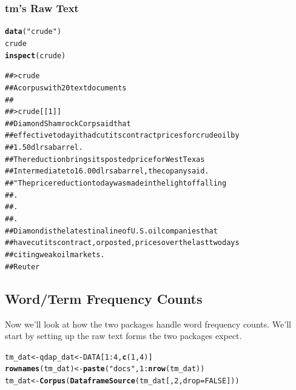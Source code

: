 \documentclass{article}\usepackage[]{graphicx}\usepackage[]{color}
\makeatletter
\newcommand{\hlnum}[1]{\textcolor[rgb]{0.686,0.059,0.569}{#1}}%
\newcommand{\hlstr}[1]{\textcolor[rgb]{0.192,0.494,0.8}{#1}}%
\newcommand{\hlopt}[1]{\textcolor[rgb]{0,0,0}{#1}}%
\newcommand{\hlstd}[1]{\textcolor[rgb]{0.345,0.345,0.345}{#1}}%
\newcommand{\hlkwb}[1]{\textcolor[rgb]{0.69,0.353,0.396}{#1}}%
\newcommand{\hlkwc}[1]{\textcolor[rgb]{0.333,0.667,0.333}{#1}}%
\newcommand{\hlkwd}[1]{\textcolor[rgb]{0.737,0.353,0.396}{\textbf{#1}}}%
\newenvironment{kframe}{%
 \def\at@end@of@kframe{}%
 \ifinner\ifhmode%
  \def\at@end@of@kframe{\end{minipage}}%
  \begin{minipage}{\columnwidth}%
 \fi\fi%
 \def\FrameCommand##1{\hskip\@totalleftmargin \hskip-\fboxsep
 \colorbox{shadecolor}{##1}\hskip-\fboxsep
     \hskip-\linewidth \hskip-\@totalleftmargin \hskip\columnwidth}%
 \MakeFramed {\advance\hsize-\width
   \@totalleftmargin\z@ \linewidth\hsize
   \@setminipage}}%
 {\par\unskip\endMakeFramed%
 \at@end@of@kframe}
\newenvironment{knitrout}{}{} %
\makeatother
\begin{document}
\subsubsection{tm's Raw Text}
\begin{knitrout}
\color{fgcolor}\begin{kframe}
\begin{alltt}
\hlkwd{data}\hlstd{(}\hlstr{"crude"}\hlstd{)}
\hlstd{crude}
\hlkwd{inspect}\hlstd{(crude)}
\end{alltt}
\end{kframe}
\end{knitrout}


\begin{knitrout}
\color{fgcolor}\begin{kframe}
\begin{alltt}
## > crude
## A corpus with 20 text documents
## 
## > crude[[1]]
## Diamond Shamrock Corp said that
## effective today it had cut its contract prices for crude oil by
## 1.50 dlrs a barrel.
##     The reduction brings its posted price for West Texas
## Intermediate to 16.00 dlrs a barrel, the copany said.
##     "The price reduction today was made in the light of falling
## .
## .
## .
##     Diamond is the latest in a line of U.S. oil companies that
## have cut its contract, or posted, prices over the last two days
## citing weak oil markets.
##  Reuter
\end{alltt}
\end{kframe}
\end{knitrout}

\subsection{Word/Term Frequency Counts}

\hspace{.4cm} Now we'll look at how the two packages handle word frequency counts.  We'll start by setting up the raw text forms the two packages expect.

\begin{knitrout}
\color{fgcolor}\begin{kframe}
\begin{alltt}
\hlstd{tm_dat} \hlkwb{<-} \hlstd{qdap_dat} \hlkwb{<-} \hlstd{DATA[}\hlnum{1}\hlopt{:}\hlnum{4}\hlstd{,} \hlkwd{c}\hlstd{(}\hlnum{1}\hlstd{,} \hlnum{4}\hlstd{)]}
\hlkwd{rownames}\hlstd{(tm_dat)} \hlkwb{<-} \hlkwd{paste}\hlstd{(}\hlstr{"docs"}\hlstd{,} \hlnum{1}\hlopt{:}\hlkwd{nrow}\hlstd{(tm_dat))}
\hlstd{tm_dat} \hlkwb{<-} \hlkwd{Corpus}\hlstd{(}\hlkwd{DataframeSource}\hlstd{(tm_dat[,} \hlnum{2}\hlstd{,} \hlkwc{drop}\hlstd{=}\hlnum{FALSE}\hlstd{]))}
\end{alltt}
\end{kframe}
\end{knitrout}
\end{document}
